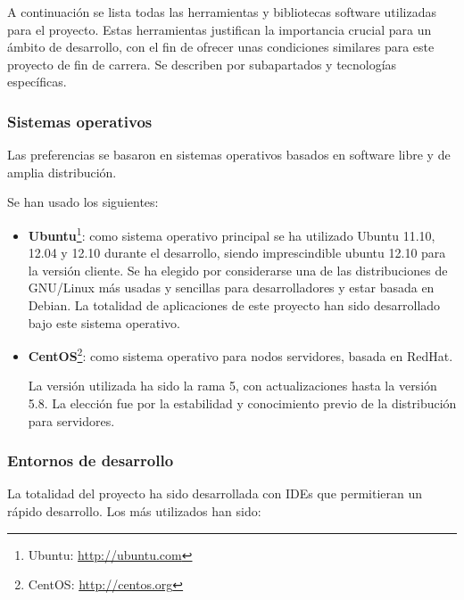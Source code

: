 A continuación se lista todas las herramientas y bibliotecas software utilizadas
para el proyecto. Estas herramientas justifican la importancia crucial para un
ámbito de desarrollo, con el fin de ofrecer unas condiciones similares para este
proyecto de fin de carrera. Se describen por subapartados y tecnologías
específicas.

\subsubsection{Sistemas operativos}

Las preferencias se basaron en sistemas operativos basados en software libre y
de amplia distribución. 

Se han usado los siguientes:

\begin{itemize}

\item \textbf{Ubuntu}\footnote{Ubuntu:
\url{http://ubuntu.com}\label{ftn:Ubuntu}}:
como sistema operativo principal se ha utilizado Ubuntu 11.10, 12.04 y 12.10
durante el desarrollo, siendo imprescindible ubuntu 12.10 para la versión
cliente. Se ha elegido por considerarse una de las distribuciones de
GNU/Linux más usadas y sencillas para desarrolladores y estar basada en 
Debian. La totalidad de aplicaciones de este proyecto han sido desarrollado
bajo este sistema operativo.

\item \textbf{CentOS}\footnote{CentOS:
\url{http://centos.org}\label{ftn:CentOS}}: como sistema operativo para
nodos servidores, basada en RedHat.

La versión utilizada ha sido la rama 5, con actualizaciones hasta
la versión 5.8. La elección fue por la estabilidad y conocimiento previo de
la distribución para servidores.
\end{itemize}

\newpage

\subsubsection{Entornos de desarrollo}

La totalidad del proyecto ha sido desarrollada con \acs{IDE}\label{acro:IDE}s
que permitieran un rápido desarrollo. Los más utilizados han sido:

